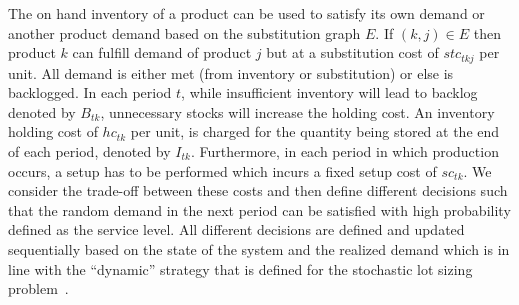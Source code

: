 \documentclass[10pt]{article}
\newcommand{\ti}{t} %
\newcommand{\ka}{k} %
\newcommand{\jey}{j} %
\newcommand{\Bi}{B} %
\newcommand{\Vi}{v} %
\begin{document}
The on hand inventory of a product can be used to satisfy its own demand or another product demand based on the substitution graph $E$. If $(k, j) \in E$ then product $\ka$  can fulfill demand of product $\jey$ but at a substitution cost of $stc_{tkj}$ per unit. All demand is either met (from inventory or substitution) or else is backlogged. In each period $\ti$, while insufficient inventory will lead to backlog denoted by $\Bi_{\ti \ka}$, unnecessary stocks will increase the holding cost. An inventory holding cost of $hc_{\ti \ka}$ per unit, is charged for the quantity being stored at the end of each period, denoted by $I_{\ti \ka}$. Furthermore, in each period in which production occurs, a setup has to be performed which incurs a fixed setup cost of $sc_{\ti \ka}$. We consider the trade-off between these costs and then define different decisions such that the random demand in the next period can be satisfied with high probability defined as the service level. 
All different decisions are defined and updated sequentially  based on the state of the system and the realized demand which is in line with the  ``dynamic'' strategy that is defined for the stochastic lot sizing problem~\cite{bookbinder1988strategies}. %



 
\end{document}
